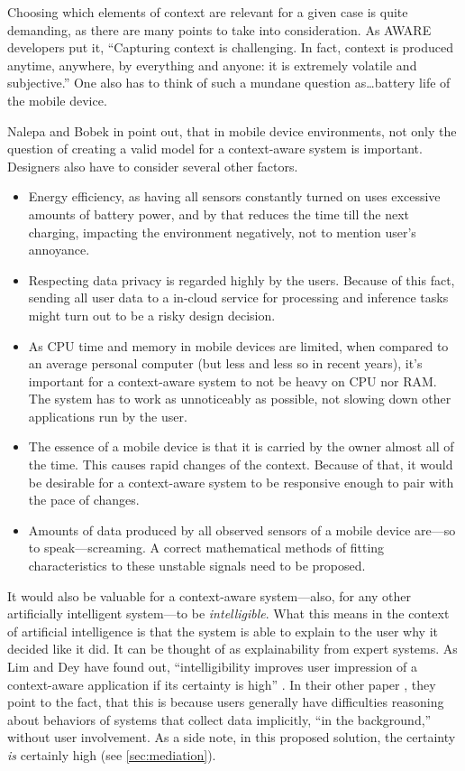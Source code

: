Choosing which elements of context are relevant for a given case is quite demanding, as there are many points to take into consideration. As AWARE developers put it, ``Capturing context is challenging. In fact, context is produced anytime, anywhere, by everything and anyone: it is extremely volatile and subjective.'' \cite{aware} One also has to think of such a mundane question as\ldots battery life of the mobile device.

Nalepa and Bobek in \cite{Bobek:rule-mobile-context} point out, that in mobile device environments, not only the question of creating a valid model for a context-aware system is important. Designers also have to consider several other factors.

\begin{itemize}
	\item Energy efficiency, as having all sensors constantly turned on uses excessive amounts of battery power, and by that reduces the time till the next charging, impacting the environment negatively, not to mention user's annoyance.
	\item Respecting data privacy is regarded highly by the users. Because of this fact, sending all user data to a in-cloud service for processing and inference tasks might turn out to be a risky design decision.
	\item As CPU time and memory in mobile devices are limited, when compared to an average personal computer (but less and less so in recent years), it's important for a context-aware system to not be heavy on CPU nor RAM. The system has to work as unnoticeably as possible, not slowing down other applications run by the user.
	\item The essence of a mobile device is that it is carried by the owner almost all of the time. This causes rapid changes of the context. Because of that, it would be desirable for a context-aware system to be responsive enough to pair with the pace of changes.
	\item Amounts of data produced by all observed sensors of a mobile device are---so to speak---screaming. A correct mathematical methods of fitting characteristics to these unstable signals need to be proposed.
\end{itemize}

It would also be valuable for a context-aware system---also, for any other artificially intelligent system---to be \emph{intelligible}. What this means in the context of artificial intelligence is that the system is able to explain to the user why it decided like it did. It can be thought of as explainability from expert systems. As Lim and Dey have found out, ``intelligibility improves user impression of a context-aware application if its certainty is high'' \cite{Dey:intelligibility}. In their other paper \cite{Dey:explainations}, they point to the fact, that this is because users generally have difficulties reasoning about behaviors of systems that collect data implicitly, ``in the background,'' without user involvement. As a side note, in this proposed solution, the certainty \emph{is} certainly high (see \cref{sec:mediation}).

